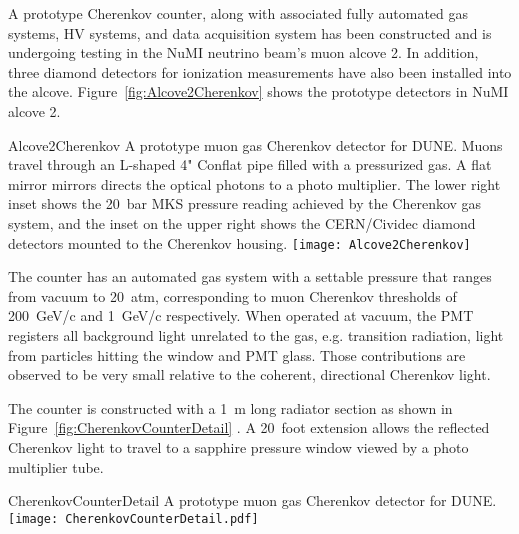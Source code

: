 A prototype Cherenkov counter, along with associated fully automated
gas systems, HV systems, and data acquisition system has been
constructed and is undergoing testing in the NuMI neutrino beam's muon
alcove 2. In addition, three diamond detectors\cite{ref:CERNdiamond}
for ionization measurements have also been installed into the alcove.
Figure~\ref{fig:Alcove2Cherenkov} shows the prototype detectors in
NuMI alcove 2.
\begin{cdrfigure}{Alcove2Cherenkov}
{A prototype muon gas Cherenkov detector for DUNE.  
Muons travel through an L-shaped 4" Conflat pipe filled with a 
pressurized gas. A flat mirror mirrors directs the optical photons 
to a photo multiplier. The lower right inset shows the 20~bar MKS 
pressure reading achieved by the Cherenkov gas system, and the inset 
on the upper right shows the CERN/Cividec diamond detectors mounted to the Cherenkov housing.}
\texttt{[image: Alcove2Cherenkov]}
\end{cdrfigure}

The counter has an automated gas system with a settable pressure that
ranges from vacuum to 20~atm, corresponding to muon Cherenkov
thresholds of 200~GeV/c and 1~GeV/c respectively. When operated at
vacuum, the PMT registers all background light unrelated to the gas,
e.g. transition radiation, light from particles hitting the window and
PMT glass.  Those contributions are observed to be very small relative
to the coherent, directional Cherenkov light.

The counter is constructed with a 1~m long radiator section as shown
in Figure~\ref{fig:CherenkovCounterDetail} . A 20~foot extension
allows the reflected Cherenkov light to travel to a sapphire pressure
window viewed by a photo multiplier tube.
\begin{cdrfigure}{CherenkovCounterDetail}
{A prototype muon gas Cherenkov detector for DUNE.  }
\texttt{[image: CherenkovCounterDetail.pdf]}
\end{cdrfigure}


